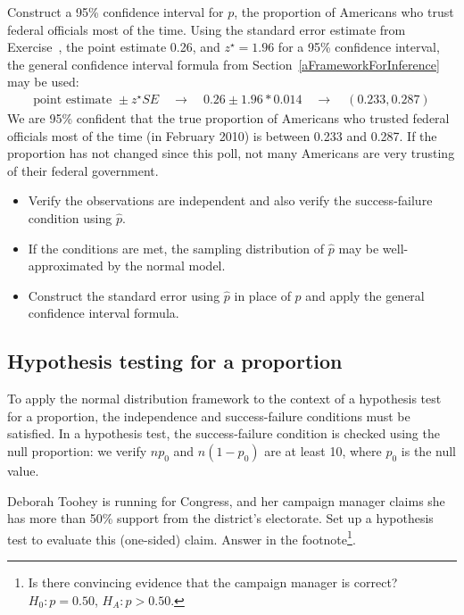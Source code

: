 \begin{example}{Construct a 95\% confidence interval for $p$, the proportion of Americans who trust federal officials most of the time.}
Using the standard error estimate from Exercise~, the point estimate 0.26, and $z^{\star} = 1.96$ for a 95\% confidence interval, the general confidence interval formula from Section~\ref{aFrameworkForInference} may be used:
\begin{eqnarray*}
\text{point estimate } \pm z^{\star}SE \quad\to\quad 0.26 \pm 1.96*0.014 \quad\to\quad (0.233, 0.287)
\end{eqnarray*}
We are 95\% confident that the true proportion of Americans who trusted federal officials most of the time (in February 2010) is between 0.233 and 0.287. If the proportion has not changed since this poll, not many Americans are very trusting of their federal government.
\end{example}

\begin{termBox}{
\begin{itemize}
\item Verify the observations are independent and also verify the success-failure condition using $\hat{p}$.
\item If the conditions are met, the sampling distribution of $\hat{p}$ may be well-approximated by the normal model.
\item Construct the standard error using $\hat{p}$ in place of $p$ and apply the general confidence interval formula.
\end{itemize}}
\end{termBox}

\subsection{Hypothesis testing for a proportion}
\label{htForPropSection}

To apply the normal distribution framework to the context of a hypothesis test for a proportion, the independence and success-failure conditions must be satisfied. In a hypothesis test, the success-failure condition is checked using the null proportion: we verify $np_0$ and $n(1-p_0)$ are at least 10, where $p_0$ is the null value.

\begin{exercise}
Deborah Toohey is running for Congress, and her campaign manager claims she has more than 50\% support from the district's electorate. Set up a hypothesis test to evaluate this (one-sided) claim. Answer in the footnote\footnote{Is there convincing evidence that the campaign manager is correct? $H_0: p = 0.50$, $H_A: p > 0.50$.}.
\end{exercise}

